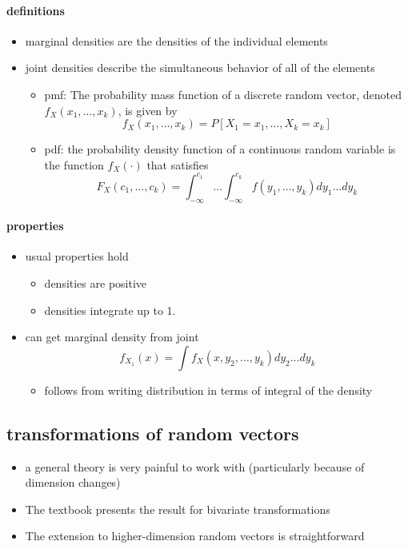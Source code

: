 \paragraph{definitions}
\label{sec-2-1-1}

\begin{itemize}
\item marginal densities are the densities of the individual elements
\item joint densities describe the simultaneous behavior of all of
        the elements
\begin{itemize}
\item pmf: The probability mass function of a discrete random vector,
          denoted $f_X(x_1,\dots, x_k)$, is given by 
          \[f_X(x_1,\dots,x_k) = P[X_1 = x_1,\dots,X_k = x_k]\]
\item pdf: the probability density function of a continuous random
          variable is the function $f_X(\cdot)$ that satisfies
          \[ F_X(c_1,\dotsc,c_k) = \int_{-\infty}^{c_1} \dots
          \int_{-\infty}^{c_k} f(y_1,\dots,y_k) dy_1 \dots dy_k \]
\end{itemize}
\end{itemize}
\paragraph{properties}
\label{sec-2-1-2}

\begin{itemize}
\item usual properties hold
\begin{itemize}
\item densities are positive
\item densities integrate up to 1.
\end{itemize}
\item can get marginal density from joint
        \[ f_{X_1}(x) = \int f_X(x, y_2,\dots,y_k) dy_2 \dots dy_k \]
\begin{itemize}
\item follows from writing distribution in terms of integral of
          the density
\end{itemize}
\end{itemize}
\subsection{transformations of random vectors}
\label{sec-2-2}

\begin{itemize}
\item a general theory is very painful to work with (particularly
        because of dimension changes)
\item The textbook presents the result for bivariate transformations
\item The extension to higher-dimension random vectors is
        straightforward
\end{itemize}
